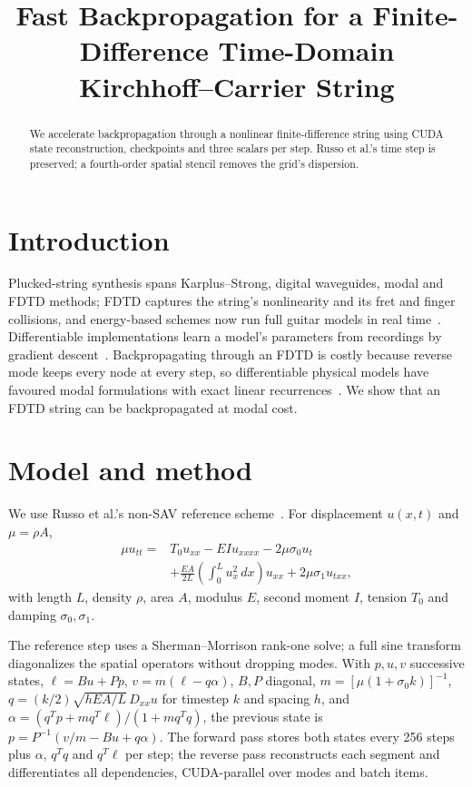 \documentclass[a4paper]{article}
\title{Fast Backpropagation for a Finite-Difference Time-Domain Kirchhoff--Carrier String}
\begin{document}
\tenpt
\maketitle
\begin{sloppy}
\begin{abstract}
We accelerate backpropagation through a nonlinear finite-difference string
using CUDA state reconstruction, checkpoints and three scalars per step.
Russo et al.'s time step is preserved; a fourth-order spatial stencil removes
the grid's dispersion.
\end{abstract}

\section{Introduction}
Plucked-string synthesis spans Karplus--Strong, digital waveguides, modal and
FDTD methods; FDTD captures the string's nonlinearity and its fret and finger
collisions, and energy-based schemes now run full guitar models in real
time~\cite{bilbao2024guitar}. Differentiable implementations learn a model's
parameters from recordings by gradient descent~\cite{engel2020ddsp,tablas2026sound}.
Backpropagating through an FDTD is costly because reverse mode keeps every
node at every step, so differentiable physical models have favoured modal
formulations with exact linear recurrences~\cite{diaz2025}. We show that an
FDTD string can be backpropagated at modal cost.

\section{Model and method}
We use Russo et al.'s non-SAV reference scheme~\cite{russo2026}. For
displacement $u(x,t)$ and $\mu=\rho A$,
\begin{equation}
\begin{aligned}
\mu u_{tt}={}&T_0u_{xx}-EIu_{xxxx}-2\mu\sigma_0u_t\\
 &+\frac{EA}{2L}\!\left(\int_0^L u_x^2\,dx\right)u_{xx}
 +2\mu\sigma_1u_{txx},
\end{aligned}
\label{eq:pde}
\end{equation}
with length $L$, density $\rho$, area $A$, modulus $E$, second moment $I$,
tension $T_0$ and damping $\sigma_0,\sigma_1$.

The reference step uses a Sherman--Morrison rank-one solve; a full sine
transform diagonalizes the spatial operators without dropping modes. With
$p,u,v$ successive states, $\ell=Bu+Pp$, $v=m(\ell-q\alpha)$, $B,P$ diagonal,
$m=[\mu(1+\sigma_0k)]^{-1}$, $q=(k/2)\sqrt{hEA/L}\,D_{xx}u$ for timestep $k$
and spacing $h$, and $\alpha=(q^Tp+mq^T\ell)/(1+mq^Tq)$, the previous state
is $p=P^{-1}(v/m-Bu+q\alpha)$. The forward pass stores both states every 256
steps plus $\alpha$, $q^Tq$ and $q^T\ell$ per step; the reverse pass
reconstructs each segment and differentiates all dependencies, CUDA-parallel
over modes and batch items.


\end{sloppy}
\end{document}
